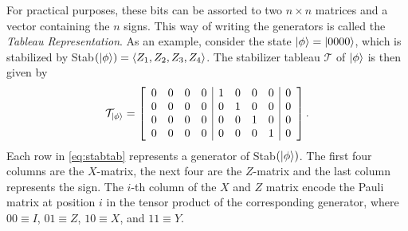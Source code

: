 For practical purposes, these bits can be assorted to two $n\times n$ matrices
and a vector containing the $n$ signs. This way of writing the generators is
called the \emph{Tableau Representation}. As an example, consider the state
$\ket{\phi}=\ket{0000}$, which is stabilized by Stab$(\ket{\phi}) = \langle
Z_1, Z_2, Z_3, Z_4\rangle$. The stabilizer tableau $\mathcal{T}$ of
$\ket{\phi}$ is then given by
\begin{align}\label{eq:stabtab}
\mathcal{T}_{\ket{\phi}} = 
\left[
  \begin{array}{cccc|cccc|c}
    0 & 0 & 0 & 0 & 1 & 0 & 0 & 0 & 0 \\
    0 & 0 & 0 & 0 & 0 & 1 & 0 & 0 & 0 \\
    0 & 0 & 0 & 0 & 0 & 0 & 1 & 0 & 0 \\
    0 & 0 & 0 & 0 & 0 & 0 & 0 & 1 & 0
  \end{array}
\right]
.\end{align}
Each row in \cref{eq:stabtab} represents a generator of Stab$(\ket{\phi})$. The
first four columns are the $X$-matrix, the next four are the $Z$-matrix and the
last column represents the sign. The $i$-th column of the $X$ and $Z$ matrix
encode the Pauli matrix at position $i$ in the tensor product of the
corresponding generator, where $00\equiv I$, $01\equiv Z$, $10\equiv X$, and
$11\equiv Y$. 

